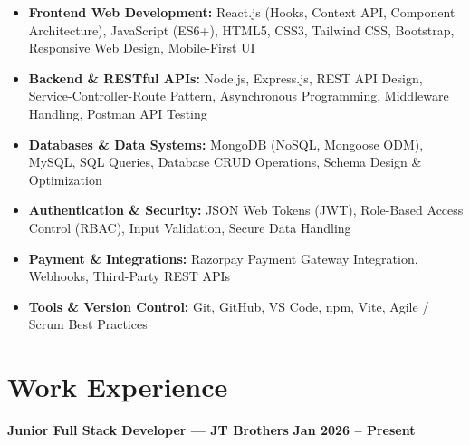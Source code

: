 \documentclass[a4paper,10pt]{article}
\begin{document}
\begin{itemize}

    \item \textbf{Frontend Web Development:}
    React.js (Hooks, Context API, Component Architecture), JavaScript (ES6+),
    HTML5, CSS3, Tailwind CSS, Bootstrap, Responsive Web Design, Mobile-First UI

    \item \textbf{Backend \& RESTful APIs:}
    Node.js, Express.js, REST API Design, Service-Controller-Route Pattern,
    Asynchronous Programming, Middleware Handling, Postman API Testing

    \item \textbf{Databases \& Data Systems:}
    MongoDB (NoSQL, Mongoose ODM), MySQL, SQL Queries,
    Database CRUD Operations, Schema Design \& Optimization

    \item \textbf{Authentication \& Security:}
    JSON Web Tokens (JWT), Role-Based Access Control (RBAC),
    Input Validation, Secure Data Handling

    \item \textbf{Payment \& Integrations:}
    Razorpay Payment Gateway Integration, Webhooks, Third-Party REST APIs

    \item \textbf{Tools \& Version Control:}
    Git, GitHub, VS Code, npm, Vite, Agile / Scrum Best Practices

\end{itemize}

\section*{Work Experience}

\textbf{Junior Full Stack Developer --- JT Brothers}
\hfill
\textbf{Jan 2026 -- Present}
\end{document}
